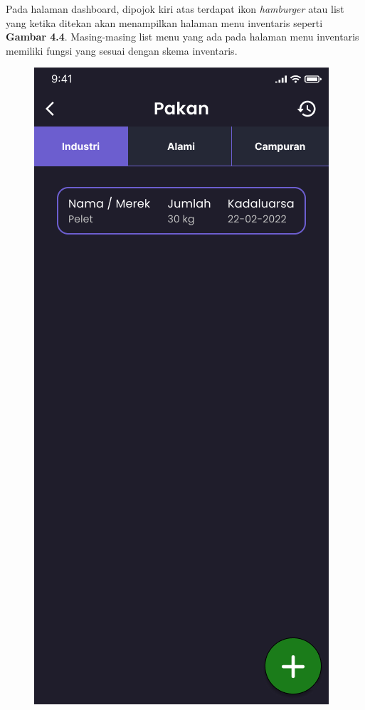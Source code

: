 \begin{spacing}{1.5}
	Pada halaman dashboard, dipojok kiri atas terdapat ikon \textit{hamburger} atau list yang ketika ditekan akan menampilkan halaman menu inventaris seperti \textbf{Gambar 4.4}. Masing-masing list menu yang ada pada halaman menu inventaris memiliki fungsi yang sesuai dengan skema inventaris.

	\begin{figure}[H]
			\includegraphics[width=\linewidth]{gambar/sprint1/mockup_detail_feed.png}

\end{figure}
\end{spacing}
